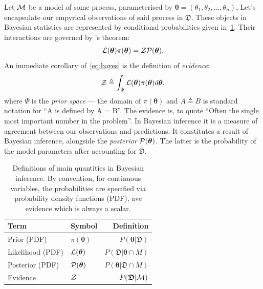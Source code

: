\documentclass[usenatbib]{mnras}
\begin{document}
Let \({\cal M}\) be a model of some process, parameterised by
\(\bm{\theta} = (\theta_{1}, \theta_{2}, \ldots , \theta_{n})\), Let's
encapsulate our empyrical observations of said process in
\(\mathfrak{D}\).  These objects in Bayesian statistics are
represented by conditional probabilities given
in~\cref{table-defs}. Their interactions are governed by
\citeauthor{1763}'s theorem:
\begin{equation}\label{eq:bayes} 
 {\cal L}(\bm{\theta})  \pi (\bm{\theta}) = {\cal Z}  {\cal P} (\bm{\theta}).
\end{equation}
An immediate corollary of~\cref{eq:bayes} is the definition of \emph{evidence}:
\begin{equation}\label{eq:def-z}
 {\cal Z} \triangleq \int_{\Psi} {\cal L}(\bm{\theta}) \pi(\bm{\theta}) d\bm{\theta}, 
\end{equation}
where \(\Psi\) is the \emph{prior space} --- the domain of
\(\pi(\bm{\theta})\) and \(A \triangleq B\) is standard notation for
``A is defined by A = B''. The evidence is, to quote
\cite{importanceOfZ} ``Often the single most important number in the
problem''. In Bayesian inference it is a measure of agreement between
our observations and predictions. It constitutes a result of Bayesian
inference, alongside the \emph{posterior} \({\cal
  P}(\bm{\theta})\). The latter is the probability of the model
parameters after accounting for \(\mathfrak{D}\). 

\begin{table}
  \caption{Definitions of main quantities in Bayesian inference. By
    convention, for continuous variables, the probabilities are
    specified via probability density functions (PDF), ave evidence
    which is always a scalar.  \label{table-defs}}
\centering
\begin{tabular}{llr}
\textbf{\textbf{Term}} & \textbf{\textbf{Symbol}} & \textbf{\textbf{Definition}}\\
\hline
Prior (PDF) & \(\pi(\bm{\theta})\) & \(P ( \bm{\theta}  \vert \bm{ \mathfrak{D}})\) \\
Likelihood (PDF) & \({\cal L}(\bm{\theta})\) & \(P ( \bm{\mathfrak{D}} \vert \bm{\theta} \cap M)\) \\
Posterior (PDF) & \({\cal P}(\bm{\theta})\) & \(P ( \bm{\theta} \vert \bm{\mathfrak{D}} \cap M)\) \\
Evidence & \({\cal Z}\) & \(P ( \bm{\mathfrak{D}} \vert {\cal M})\) \\
\end{tabular}
\end{table}
\end{document}
